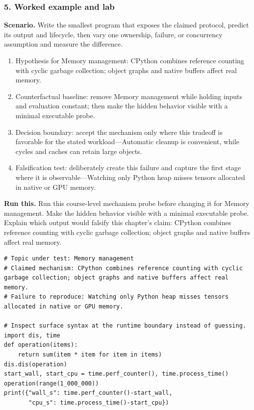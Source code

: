 \subsubsection*{5. Worked example and lab}
\textbf{Scenario.} Write the smallest program that exposes the claimed protocol, predict its output and lifecycle, then vary one ownership, failure, or concurrency assumption and measure the difference.
\begin{enumerate}
\item Hypothesis for Memory management: CPython combines reference counting with cyclic garbage collection; object graphs and native buffers affect real memory.
\item Counterfactual baseline: remove Memory management while holding inputs and evaluation constant; then make the hidden behavior visible with a minimal executable probe.
\item Decision boundary: accept the mechanism only where this tradeoff is favorable for the stated workload—Automatic cleanup is convenient, while cycles and caches can retain large objects.
\item Falsification test: deliberately create this failure and capture the first stage where it is observable—Watching only Python heap misses tensors allocated in native or GPU memory.
\end{enumerate}
\textbf{Run this.} Run this course-level mechanism probe before changing it for Memory management. Make the hidden behavior visible with a minimal executable probe. Explain which output would falsify this chapter's claim: CPython combines reference counting with cyclic garbage collection; object graphs and native buffers affect real memory.
\begin{Verbatim}[fontsize=\scriptsize]
# Topic under test: Memory management
# Claimed mechanism: CPython combines reference counting with cyclic garbage collection; object graphs and native buffers affect real memory.
# Failure to reproduce: Watching only Python heap misses tensors allocated in native or GPU memory.

# Inspect surface syntax at the runtime boundary instead of guessing.
import dis, time
def operation(items):
    return sum(item * item for item in items)
dis.dis(operation)
start_wall, start_cpu = time.perf_counter(), time.process_time()
operation(range(1_000_000))
print({"wall_s": time.perf_counter()-start_wall,
       "cpu_s": time.process_time()-start_cpu})
\end{Verbatim}
